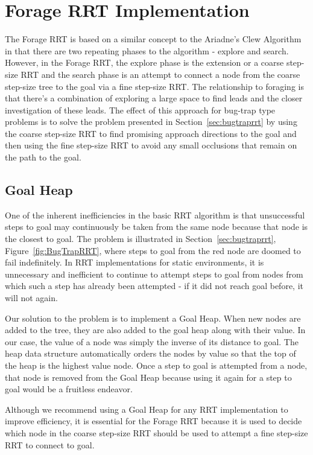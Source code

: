 \documentclass[conference]{IEEEtran}
\begin{document}
\section{Forage RRT Implementation}
\label{sec:implementation}
The Forage RRT is based on a similar concept to the Ariadne's Clew Algorithm \cite{bessiere93} in that there are two repeating phases to the
algorithm - explore and search. However, in the Forage RRT, the explore phase is the extension or a coarse step-size RRT and the search phase
is an attempt to connect a node from the coarse step-size tree to the goal via a fine step-size RRT. The relationship to foraging is that
there's a combination of exploring a large space to find leads and the closer investigation of these leads. The effect of this approach for
bug-trap type problems is to solve the problem presented in Section~\ref{sec:bugtraprrt} by using the coarse step-size RRT to find
promising approach directions to the goal and then using the fine step-size RRT to avoid any small occlusions that remain on the path to the
goal.

\subsection{Goal Heap}
One of the inherent inefficiencies in the basic RRT algorithm is that unsuccessful steps to goal may continuously be taken from the same
node because that node is the closest to goal. The problem is illustrated in Section~\ref{sec:bugtraprrt}, Figure~\ref{fig:BugTrapRRT},
where steps to goal from the red node are doomed to fail indefinitely. In RRT implementations for static environments, it is unnecessary and
inefficient to continue to attempt steps to goal from nodes from which such a step has already been attempted - if it did not reach goal
before, it will not again. 

Our solution to the problem is to implement a Goal Heap. When new nodes are added to the tree, they are also added to the goal heap along
with their value. In our case, the value of a node was simply the inverse of its distance to goal. The heap data structure automatically
orders the nodes by value so that the top of the heap is the highest value node. Once a step to goal is attempted from a node, that node is
removed from the Goal Heap because using it again for a step to goal would be a fruitless endeavor.

Although we recommend using a Goal Heap for any RRT implementation to improve efficiency, it is essential for the Forage RRT because it is
used to decide which node in the coarse step-size RRT should be used to attempt a fine step-size RRT to connect to goal.
\end{document}
